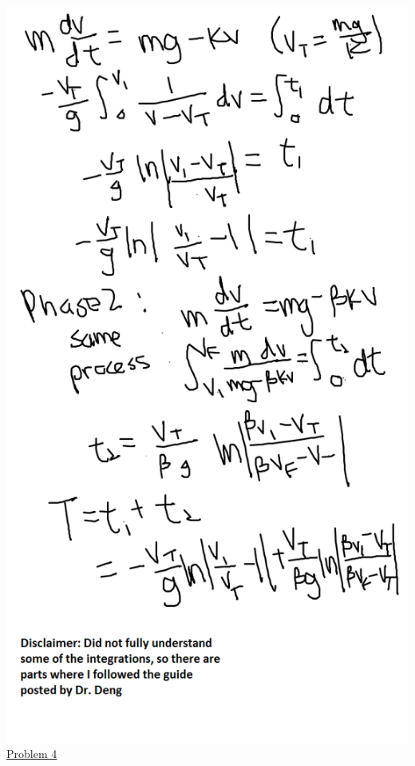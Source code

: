 \documentclass{article}
\begin{document}
\includegraphics[width=\textwidth,height=\textheight,keepaspectratio]{3-3bv2.png}\clearpage{}
\underline{Problem 4}\newline{}
\end{document}

